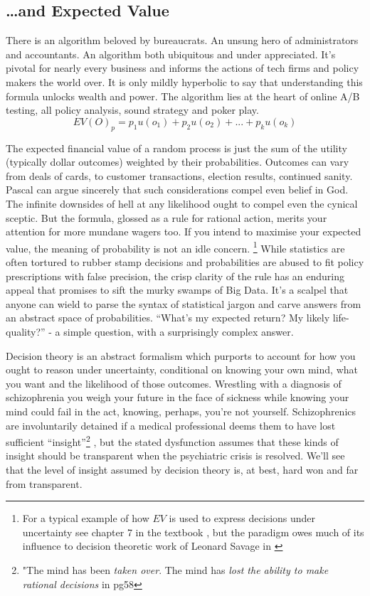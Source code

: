 \documentclass[]{tufte-book}
\theoremstyle{definition}
\theoremstyle{definition}
\theoremstyle{definition}
\theoremstyle{remark}
\begin{document}
\hypertarget{and-expected-value}{%
\subsection{\ldots and Expected Value}\label{and-expected-value}}

There is an algorithm beloved by bureaucrats. An unsung hero of administrators and accountants. An algorithm both ubiquitous and under appreciated. It's pivotal for nearly every business and informs the actions of tech firms and policy makers the world over. It is only mildly hyperbolic to say that understanding this formula unlocks wealth and power. The algorithm lies at the heart of online A/B testing, all policy analysis, sound strategy and poker play. \[ EV(O)_{p} = p_{1}u(o_{1}) + p_{2}u(o_{2}) + ... + p_{k}u(o_{k}) \]

The expected financial value of a random process is just the sum of the utility (typically dollar outcomes) weighted by their probabilities. Outcomes can vary from deals of cards, to customer transactions, election results, continued sanity. Pascal can argue sincerely that such considerations compel even belief in God. The infinite downsides of hell at any likelihood ought to compel even the cynical sceptic. But the formula, glossed as a rule for rational action, merits your attention for more mundane wagers too. If you intend to maximise your expected value, the meaning of probability is not an idle concern. \footnote{For a typical example of how \(EV\) is used to express decisions under uncertainty see chapter 7 in the textbook \citep{BarberBR_ML}, but the paradigm owes much of its influence to decision theoretic work of Leonard Savage in \citep{savage54}} While statistics are often tortured to rubber stamp decisions and probabilities are abused to fit policy prescriptions with false precision, the crisp clarity of the rule has an enduring appeal that promises to sift the murky swamps of Big Data. It's a scalpel that anyone can wield to parse the syntax of statistical jargon and carve answers from an abstract space of probabilities. ``What's my expected return? My likely life-quality?'' - a simple question, with a surprisingly complex answer.

Decision theory is an abstract formalism which purports to account for how you ought to reason under uncertainty, conditional on knowing your own mind, what you want and the likelihood of those outcomes. Wrestling with a diagnosis of schizophrenia you weigh your future in the face of sickness while knowing your mind could fail in the act, knowing, perhaps, you're not yourself. Schizophrenics are involuntarily detained if a medical professional deems them to have lost sufficient ``insight''\footnote{"The mind has been \emph{taken over}. The mind has \emph{lost the ability to make rational decisions} in \citep{WangSchizophrenia} pg58} , but the stated dysfunction assumes that these kinds of insight should be transparent when the psychiatric crisis is resolved. We'll see that the level of insight assumed by decision theory is, at best, hard won and far from transparent.
\end{document}
